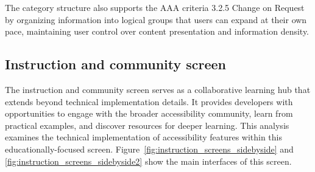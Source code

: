 The category structure also supports the AAA criteria 3.2.5 Change on Request by organizing information into logical groups that users can expand at their own pace, maintaining user control over content presentation and information density.

\subsection{Instruction and community screen}
\label{subsec:instruction-community}

The instruction and community screen serves as a collaborative learning hub that extends beyond technical implementation details. It provides developers with opportunities to engage with the broader accessibility community, learn from practical examples, and discover resources for deeper learning. This analysis examines the technical implementation of accessibility features within this educationally-focused screen.
 Figure~\ref{fig:instruction_screens_sidebyside} and \ref{fig:instruction_screens_sidebyside2} show the main interfaces of this screen.

